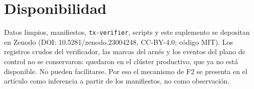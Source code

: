 \documentclass[11pt,letterpaper]{article}
\begin{document}
\section*{Disponibilidad}
Datos limpios, manifiestos, \texttt{tx-verifier}, scripts y este suplemento se depositan en Zenodo (DOI: 10.5281/\allowbreak zenodo.23004248, CC-BY-4.0; código MIT). Los registros crudos del verificador, las marcas del arnés y los eventos del plano de control no se conservaron: quedaron en el clúster productivo, que ya no está disponible. No pueden facilitarse. Por eso el mecanismo de F2 se presenta en el artículo como inferencia a partir de los manifiestos, no como observación.
\end{document}
